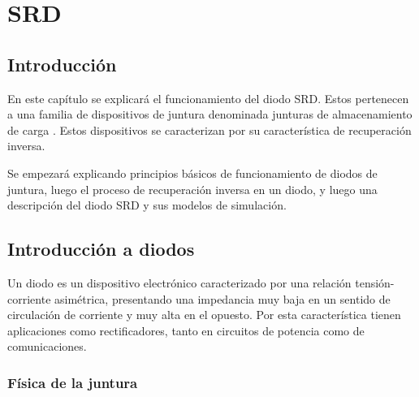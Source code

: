 \chapter{SRD}

\section{Introducción}

En este capítulo se explicará el funcionamiento del diodo SRD.  Estos pertenecen
a una familia de dispositivos de juntura denominada junturas de almacenamiento
de carga \cite{moll1962}. Estos dispositivos se caracterizan por su
característica de recuperación inversa.

Se empezará explicando principios básicos de funcionamiento de diodos de
juntura, luego el proceso de recuperación inversa en un diodo, y luego una
descripción del diodo SRD y sus modelos de simulación.

\section{Introducción a diodos}

Un diodo es un dispositivo electrónico caracterizado por una relación
tensión-corriente asimétrica, presentando una impedancia muy baja en un sentido
de circulación de corriente y muy alta en el opuesto. Por esta característica
tienen aplicaciones como rectificadores, tanto en circuitos de potencia como de
comunicaciones.

\subsection{Física de la juntura}
\label{sec:junction_physics}


